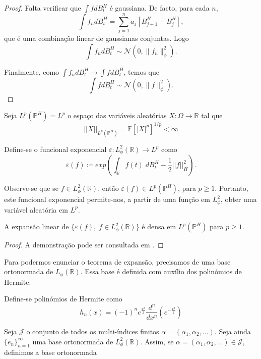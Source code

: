 \documentclass{article}
\begin{document}
\begin{proof}
    Falta verificar que $\int f dB_t^H$ é gaussiana. De facto, para cada $n$,
    $$\int f_ndB^H_t=\sum_{j=1}^na_j[B^H_{j+1}-B^H_{j}],$$
    que é uma combinação linear de gaussianas conjuntas. Logo
    $$\int f_ndB^H_t \sim \mathcal{N}(0, \|f_n\|_\phi^2).$$

    Finalmente, como $\int f_ndB^H_t \longrightarrow \int fdB^H_t$, temos que 
    $$\int fdB^H_t \sim \mathcal{N}(0, \|f\|_\phi^2).$$
    
\end{proof}

\vspace{0.5cm}
Seja $L^p(\mathbb{P}^H)=L^p$ o espaço das variáveis aleatórias $X:\Omega \rightarrow \mathbb{R}$ tal que 
$$||X||_{L^p(\mathbb{P}^H)}=\mathbb{E}[|X|^p]^{1/p}<\infty$$
\begin{dfn}
    Define-se o funcional exponencial $\varepsilon: L^2_\phi(\mathbb{R}) \rightarrow L^p$ como
    $$\varepsilon(f) \coloneq exp \left( \int_\mathbb{R} f(t) \;dB^H_t- \frac{1}{2}||f||_H^2\right).$$
\end{dfn}

Observe-se que se $f \in L^2_\phi(\mathbb{R})$, então $\varepsilon(f) \in L^p(\mathbb{P}^H)$, para $p \geq 1$. Portanto, este funcional exponencial permite-nos, a partir de uma função em $L^2_\phi$, obter uma variável aleatória em $L^p$.

\vspace{0.5cm}

\begin{lema}
    A expansão linear de $\{ \varepsilon(f),\;f\in L^2_\phi(\mathbb{R})\}$ é densa em $L^p(\mathbb{P}^H)$ para $p\geq1$.
\end{lema}
\begin{proof}
    A demonstração pode ser consultada em \cite{Duncan2000}.
\end{proof}

\vspace{0.5cm}


Para podermos enunciar o teorema de expansão, precisamos de uma base ortonormada de $L_\phi(\mathbb{R})$. Essa base é definida com auxílio dos polinómios de Hermite:

\begin{dfn}
    Define-se polinómios de Hermite como
    $$h_n(x)=(-1)^ne^{\frac{x^2}{2}}\frac{d^n}{dx^n}\left(e^{-\frac{x^2}{2}}\right)$$
\end{dfn}
\vspace{0.2cm}
Seja $\mathcal{J}$ o conjunto de todos os multi-índices finitos $\alpha=(\alpha_1,\alpha_2,...)$. Seja ainda $\{e_n\}_{n=1}^\infty$ uma base ortonormada de $L^2_\phi (\mathbb{R})$.
Assim, se $\alpha=(\alpha_1,\alpha_2,...) \in \mathcal{J}$, definimos a base ortonormada 
\end{document}
